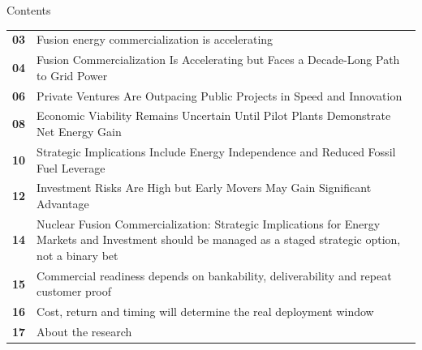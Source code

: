\documentclass[10pt,a4paper]{article}
\begin{document}
\clearpage
{\sffamily\fontsize{26}{31}\selectfont\color{BONavy} Contents}\par\vspace{10pt}
\begin{tabularx}{\linewidth}{p{14mm}Y}
\textcolor{BOGreen}{\bfseries 03} & Fusion energy commercialization is accelerating \\[5pt]
\textcolor{BOGreen}{\bfseries 04} & Fusion Commercialization Is Accelerating but Faces a Decade-Long Path to Grid Power \\[5pt]
\textcolor{BOGreen}{\bfseries 06} & Private Ventures Are Outpacing Public Projects in Speed and Innovation \\[5pt]
\textcolor{BOGreen}{\bfseries 08} & Economic Viability Remains Uncertain Until Pilot Plants Demonstrate Net Energy Gain \\[5pt]
\textcolor{BOGreen}{\bfseries 10} & Strategic Implications Include Energy Independence and Reduced Fossil Fuel Leverage \\[5pt]
\textcolor{BOGreen}{\bfseries 12} & Investment Risks Are High but Early Movers May Gain Significant Advantage \\[5pt]
\textcolor{BOGreen}{\bfseries 14} & Nuclear Fusion Commercialization: Strategic Implications for Energy Markets and Investment should be managed as a staged strategic option, not a binary bet \\[5pt]
\textcolor{BOGreen}{\bfseries 15} & Commercial readiness depends on bankability, deliverability and repeat customer proof \\[5pt]
\textcolor{BOGreen}{\bfseries 16} & Cost, return and timing will determine the real deployment window \\[5pt]
\textcolor{BOGreen}{\bfseries 17} & About the research \\[5pt]
\end{tabularx}
\clearpage
\end{document}
